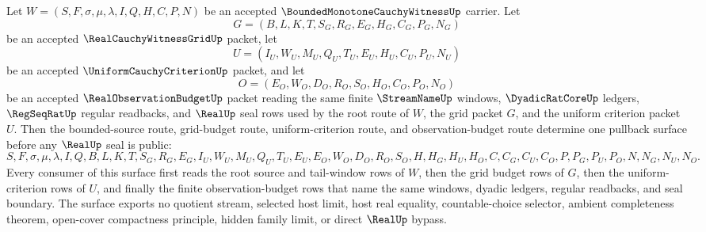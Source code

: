 \begin{theorem}
\label{thm:bounded-monotone-cauchy-witness-observation-budget-grid-pullback}
Let $W=(S,F,\sigma,\mu,\lambda,I,Q,H,C,P,N)$ be an accepted $\BoundedMonotoneCauchyWitnessUp$ carrier. Let
$$
G=(B,L,K,T,S_G,R_G,E_G,H_G,C_G,P_G,N_G)
$$
be an accepted $\RealCauchyWitnessGridUp$ packet, let
$$
U=(I_U,W_U,M_U,Q_U,T_U,E_U,H_U,C_U,P_U,N_U)
$$
be an accepted $\UniformCauchyCriterionUp$ packet, and let
$$
O=(E_O,W_O,D_O,R_O,S_O,H_O,C_O,P_O,N_O)
$$
be an accepted $\RealObservationBudgetUp$ packet reading the same finite $\StreamNameUp$ windows, $\DyadicRatCoreUp$ ledgers, $\RegSeqRatUp$ regular readbacks, and $\RealUp$ seal rows used by the root route of $W$, the grid packet $G$, and the uniform criterion packet $U$. Then the bounded-source route, grid-budget route, uniform-criterion route, and observation-budget route determine one pullback surface before any $\RealUp$ seal is public:
$$
S,F,\sigma,\mu,\lambda,I,Q,B,L,K,T,S_G,R_G,E_G,I_U,W_U,M_U,Q_U,T_U,E_U,E_O,W_O,D_O,R_O,S_O,H,H_G,H_U,H_O,C,C_G,C_U,C_O,P,P_G,P_U,P_O,N,N_G,N_U,N_O.
$$
Every consumer of this surface first reads the root source and tail-window rows of $W$, then the grid budget rows of $G$, then the uniform-criterion rows of $U$, and finally the finite observation-budget rows that name the same windows, dyadic ledgers, regular readbacks, and seal boundary. The surface exports no quotient stream, selected host limit, host real equality, countable-choice selector, ambient completeness theorem, open-cover compactness principle, hidden family limit, or direct $\RealUp$ bypass.
\end{theorem}
